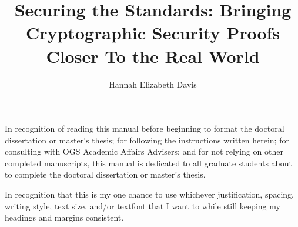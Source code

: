 \documentclass[11pt]{ucsddissertation}
\title{Securing the Standards: Bringing Cryptographic Security Proofs Closer To the Real World}
\author{Hannah Elizabeth Davis}
\begin{document}
\frontmatter
\maketitle
\makecopyright
\makesignature
\begin{dedication}
\setsinglespacing
\raggedright %
\parindent0pt\parskip\baselineskip
In recognition of reading this manual before beginning to format the
doctoral dissertation or master's thesis; for following the
instructions written herein; for consulting with OGS Academic Affairs
Advisers; and for not relying on other completed manuscripts, this
manual is dedicated to all graduate students about to complete the
doctoral dissertation or master's thesis.

In recognition that this is my one chance to use whichever
justification, spacing, writing style, text size, and/or textfont that
I want to while still keeping my headings and margins consistent.
\end{dedication}




\end{document}
